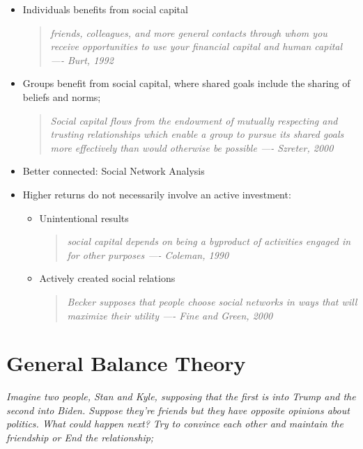\documentclass[
  notitlepage,
  onecolumn,
  openany]{book}
\begin{document}
\begin{itemize}
\item
  Individuals benefits from social capital

  \begin{quote}
  \emph{friends, colleagues, and more general contacts through whom you
  receive opportunities to use your financial capital and human capital
  ---- Burt, 1992}
  \end{quote}
\item
  Groups benefit from social capital, where shared goals include the sharing of beliefs and norms;

  \begin{quote}
  \emph{Social capital flows from the endowment of mutually respecting and
  trusting relationships which enable a group to pursue its shared goals
  more effectively than would otherwise be possible
  ---- Szreter, 2000}
  \end{quote}
\item
  Better connected: Social Network Analysis
\item
  Higher returns do not necessarily involve an active investment:

  \begin{itemize}
  \item
    Unintentional results

    \begin{quote}
    \emph{social capital depends on being a byproduct of activities
    engaged in for other purposes
    ---- Coleman, 1990}
    \end{quote}
  \item
    Actively created social relations

    \begin{quote}
    \emph{Becker supposes that people choose social networks in ways
    that will maximize their utility
    ---- Fine and Green, 2000}
    \end{quote}
  \end{itemize}
\end{itemize}

\hypertarget{general-balance-theory}{%
\section{General Balance Theory}\label{general-balance-theory}}

\emph{Imagine two people, Stan and Kyle, supposing that the first is into Trump and the second into Biden. Suppose they're friends but they have opposite opinions about politics. What could happen next? Try to convince each other and maintain the friendship or End the relationship;}
\end{document}
